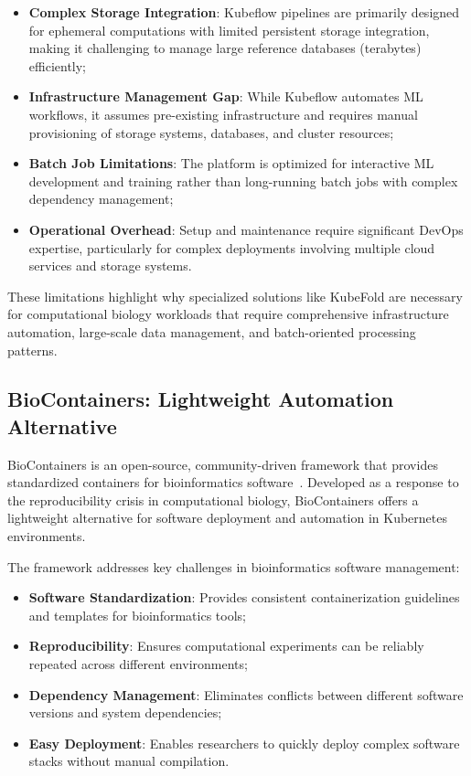 \begin{itemize}
    \item \textbf{Complex Storage Integration}: Kubeflow pipelines are primarily designed for ephemeral computations with limited persistent storage integration, making it challenging to manage large reference databases (terabytes) efficiently;
    \item \textbf{Infrastructure Management Gap}: While Kubeflow automates ML workflows, it assumes pre-existing infrastructure and requires manual provisioning of storage systems, databases, and cluster resources;
    \item \textbf{Batch Job Limitations}: The platform is optimized for interactive ML development and training rather than long-running batch jobs with complex dependency management;
    \item \textbf{Operational Overhead}: Setup and maintenance require significant DevOps expertise, particularly for complex deployments involving multiple cloud services and storage systems.
\end{itemize}

These limitations highlight why specialized solutions like KubeFold are necessary for computational biology workloads that require comprehensive infrastructure automation, large-scale data management, and batch-oriented processing patterns.

\subsection{BioContainers: Lightweight Automation Alternative}

BioContainers is an open-source, community-driven framework that provides standardized containers for bioinformatics software~\cite{biocontainers}.
Developed as a response to the reproducibility crisis in computational biology, BioContainers offers a lightweight alternative for software deployment and automation in Kubernetes environments.

The framework addresses key challenges in bioinformatics software management:
\begin{itemize}
    \item \textbf{Software Standardization}: Provides consistent containerization guidelines and templates for bioinformatics tools;
    \item \textbf{Reproducibility}: Ensures computational experiments can be reliably repeated across different environments;
    \item \textbf{Dependency Management}: Eliminates conflicts between different software versions and system dependencies;
    \item \textbf{Easy Deployment}: Enables researchers to quickly deploy complex software stacks without manual compilation.
\end{itemize}

